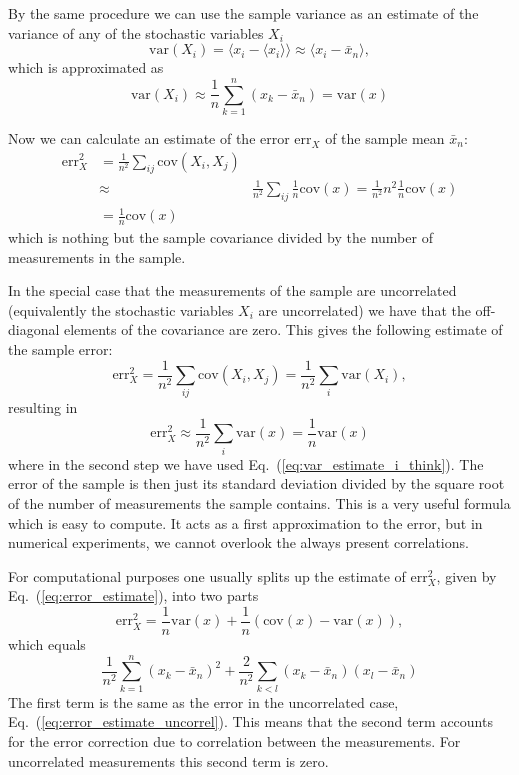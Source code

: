 \documentclass[graybox,sectrefs,envcountresetchap,open=right]{svmonodo}
\begin{document}
By the same procedure we can use the sample variance as an
estimate of the variance of any of the stochastic variables $X_i$
\[
\mathrm{var}(X_i)=\langle x_i - \langle x_i\rangle\rangle \approx \langle x_i - \bar x_n\rangle\nonumber,
\]
which is approximated as 
\begin{equation}
\mathrm{var}(X_i)\approx \frac{1}{n}\sum_{k=1}^n (x_k - \bar x_n)=\mathrm{var}(x)
\label{eq:var_estimate_i_think}
\end{equation}

Now we can calculate an estimate of the error
$\mathrm{err}_X^{\phantom X}$ of the sample mean $\bar x_n$:
\begin{align}
\mathrm{err}_X^2
&=\frac{1}{n^2}\sum_{ij} \mathrm{cov}(X_i, X_j) \nonumber \\
&\approx&\frac{1}{n^2}\sum_{ij}\frac{1}{n}\mathrm{cov}(x) =\frac{1}{n^2}n^2\frac{1}{n}\mathrm{cov}(x)\nonumber\\
&=\frac{1}{n}\mathrm{cov}(x)
\label{eq:error_estimate}
\end{align}
which is nothing but the sample covariance divided by the number of
measurements in the sample.






In the special case that the measurements of the sample are
uncorrelated (equivalently the stochastic variables $X_i$ are
uncorrelated) we have that the off-diagonal elements of the covariance
are zero. This gives the following estimate of the sample error:
\[
\mathrm{err}_X^2=\frac{1}{n^2}\sum_{ij} \mathrm{cov}(X_i, X_j) =
\frac{1}{n^2} \sum_i \mathrm{var}(X_i),
\]
resulting in
\begin{equation}
\mathrm{err}_X^2\approx \frac{1}{n^2} \sum_i \mathrm{var}(x)= \frac{1}{n}\mathrm{var}(x)
\label{eq:error_estimate_uncorrel}
\end{equation}
where in the second step we have used Eq.~(\ref{eq:var_estimate_i_think}).
The error of the sample is then just its standard deviation divided by
the square root of the number of measurements the sample contains.
This is a very useful formula which is easy to compute. It acts as a
first approximation to the error, but in numerical experiments, we
cannot overlook the always present correlations.





For computational purposes one usually splits up the estimate of
$\mathrm{err}_X^2$, given by Eq.~(\ref{eq:error_estimate}), into two
parts
\[
\mathrm{err}_X^2 = \frac{1}{n}\mathrm{var}(x) + \frac{1}{n}(\mathrm{cov}(x)-\mathrm{var}(x)),
\]
which equals
\begin{equation}
\frac{1}{n^2}\sum_{k=1}^n (x_k - \bar x_n)^2 +\frac{2}{n^2}\sum_{k<l} (x_k - \bar x_n)(x_l - \bar x_n)
\label{eq:error_estimate_split_up}
\end{equation}
The first term is the same as the error in the uncorrelated case,
Eq.~(\ref{eq:error_estimate_uncorrel}). This means that the second
term accounts for the error correction due to correlation between the
measurements. For uncorrelated measurements this second term is zero.
\end{document}
